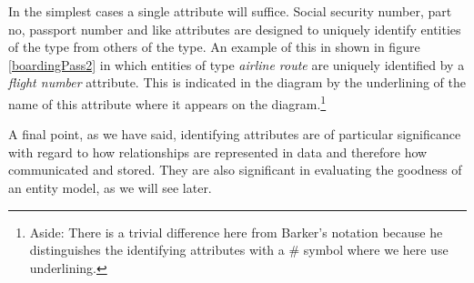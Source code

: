 \mynote In the simplest cases a single attribute will suffice. 
Social security number, part no, 
passport number and like attributes are designed to uniquely identify entities of the type from others of the type. 
An example of this 
in  shown in figure \ref{boardingPass2} in which entities of type \textit{airline route} are uniquely identified by a \textit{flight number} attribute.
This is
indicated in the diagram  by the underlining of the name of this attribute where it appears on the diagram.\footnote{Aside: There is a trivial difference here from Barker's notation because he distinguishes the identifying attributes with a \# symbol where we here use  underlining.} 


\mynote A final point, as we have said, identifying attributes are of particular significance with regard to 
 how relationships are represented in data and therefore how communicated and stored.
They are also significant in evaluating the goodness of an entity model, as we will see later.





 
